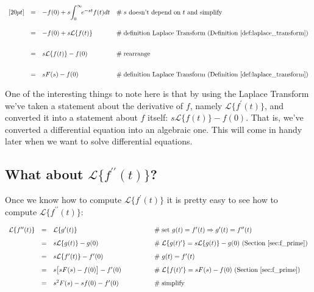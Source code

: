 \documentclass{article}
\theoremstyle{definition}
\begin{document}
\begin{equation*}
\begin{array}{lllll}
[20pt] 
&=& -f(0) + s \mathlarger{\int}^\infty_0 \!  e^{-st}  f(t) dt
                                &\mathrel{\#} \text{$s$ doesn't depend on $t$ and simplify} \\
[20pt] 
&=& -f(0) + s \mathcal{L}\{f(t)\}
                                &\mathrel{\#} \text{definition Laplace Transform (Definition \ref{def:laplace_transform})} \\ 
[20pt] 
&=& s \mathcal{L}\{f(t)\} - f(0)
                                &\mathrel{\#} \text{rearrange} \\
[20pt] 
&=& s F(s) - f(0)               &\mathrel{\#} \text{definition Laplace Transform (Definition \ref{def:laplace_transform})} \\ 
\end{array}
\end{equation*}

\bigskip
\noindent
One of the interesting things to note here is that by using the
Laplace Transform we've taken a statement about the derivative of
$f$, namely $\mathcal{L}\{f^\prime(t)\}$, and converted it into a
statement about $f$ itself: $s \mathcal{L}\{f(t)\} - f(0)$. That
is, we've converted a differential equation into an algebraic
one. This will come in handy later when we want to solve
differential equations.

\newpage
\subsection{What about $\mathcal{L}\{f^{\prime\prime}(t)\}$?}
\label{eqn:f_double_prime}

\bigskip
\noindent
Once we know how to compute $\mathcal{L}\{f^{\prime}(t)\}$ it is
pretty easy to see how to compute
$\mathcal{L}\{f^{\prime\prime}(t)\}$: 

\begin{equation*}
\begin{array}{lllll}
\mathcal{L}\{f^{\prime \prime}(t)\}           
&=&  \mathcal{L}\{g^\prime (t)\}
                        &\qquad \qquad \mathrel{\#} \text{set
                        $g(t) = f^\prime(t) \Rightarrow
                        g^\prime(t) = f^{\prime \prime}(t)$} \\  
[8pt]
&=& s \mathcal{L}\{g(t)\}  - g(0)
                        &\qquad  \qquad \mathrel{\#}
                        \mathcal{L}\{g(t)^\prime\} = s
                        \mathcal{L}\{g(t)\}  - g(0) \text{
                        (Section \ref{sec:f_prime})} \\ 
[8pt]
&=& s \mathcal{L}\{f^\prime(t)\} - f^\prime(0)
                        &\qquad \qquad \mathrel{\#} g(t) = f^\prime(t) \\
[8pt] 
&=& s \big [ sF(s) - f(0) \big ] - f^\prime(0)
                        &\qquad \qquad \mathrel{\#}
                        \mathcal{L}\{f(t)^\prime\} = s F(s) -f(0)
                        \text{ (Section \ref{sec:f_prime})} \\ 
[8pt]
&=& s^2F(s) - sf(0) - f^\prime(0)
                        &\qquad \qquad \mathrel{\#} \text{simplify}
\end{array}
\end{equation*}
\end{document}
